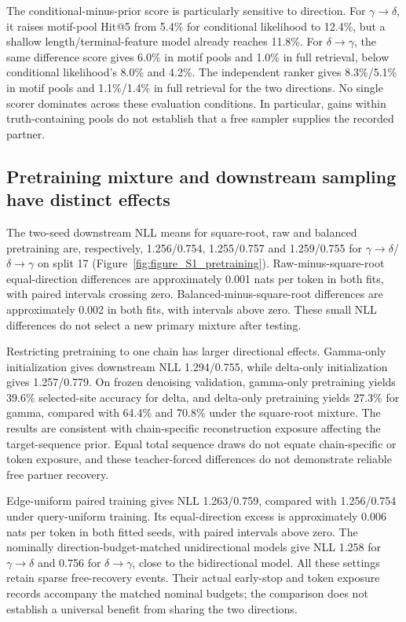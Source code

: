 \documentclass[10pt]{article}
\newcommand{\gtd}{\ensuremath{\gamma\!\rightarrow\!\delta}}
\newcommand{\dtg}{\ensuremath{\delta\!\rightarrow\!\gamma}}
\begin{document}
The conditional-minus-prior score is particularly sensitive to direction.
For \gtd{}, it raises motif-pool Hit@5 from 5.4\% for conditional likelihood
to 12.4\%, but a shallow length/terminal-feature model already reaches 11.8\%.
For \dtg{}, the same difference score gives 6.0\% in motif pools and 1.0\%
in full retrieval, below conditional likelihood's 8.0\% and 4.2\%.
The independent ranker gives 8.3\%/5.1\% in motif pools and 1.1\%/1.4\%
in full retrieval for the two directions. No single scorer dominates across
these evaluation conditions. In particular, gains within truth-containing
pools do not establish that a free sampler supplies the recorded partner.

\subsection{Pretraining mixture and downstream sampling have distinct effects}
The two-seed downstream NLL means for square-root, raw and balanced pretraining
are, respectively, 1.256/0.754, 1.255/0.757 and 1.259/0.755 for \gtd{}/\dtg{}
on split 17 (Figure~\ref{fig:figure_S1_pretraining}). Raw-minus-square-root
equal-direction differences are approximately 0.001 nats per token in both
fits, with paired intervals crossing zero. Balanced-minus-square-root
differences are approximately 0.002 in both fits, with intervals above zero.
These small NLL differences do not select a new primary mixture after testing.

Restricting pretraining to one chain has larger directional effects. Gamma-only
initialization gives downstream NLL 1.294/0.755, while delta-only initialization
gives 1.257/0.779. On frozen denoising validation, gamma-only pretraining yields
39.6\% selected-site accuracy for delta, and delta-only pretraining yields
27.3\% for gamma, compared with 64.4\% and 70.8\% under the square-root
mixture. The results are consistent with chain-specific reconstruction exposure
affecting the target-sequence prior. Equal total sequence draws do not equate
chain-specific or token exposure, and these teacher-forced differences do not
demonstrate reliable free partner recovery.

Edge-uniform paired training gives NLL 1.263/0.759, compared with 1.256/0.754
under query-uniform training. Its equal-direction excess is approximately
0.006 nats per token in both fitted seeds, with paired intervals above zero.
The nominally direction-budget-matched unidirectional models give NLL
1.258 for \gtd{} and 0.756 for \dtg{}, close to the bidirectional model.
All these settings retain sparse free-recovery events. Their actual early-stop
and token exposure records accompany the matched nominal budgets; the comparison
does not establish a universal benefit from sharing the two directions.
\end{document}

